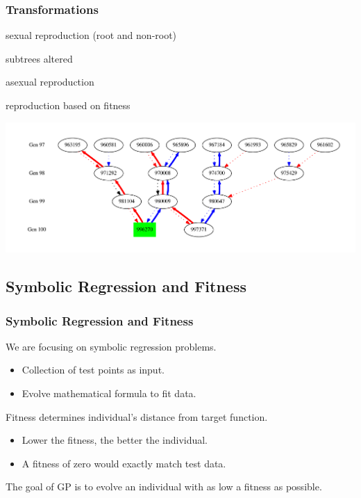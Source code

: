 \documentclass{beamer}
\newcommand{\linespace}{\vskip 0.25cm}
\begin{document}
\begin{frame}
  \frametitle{Transformations}

		\begin{description}[align=left, leftmargin=*]
		\item[Crossover (XO)] sexual reproduction (root and non-root)
		\item[Mutation] subtrees altered
		\item[Reproduction] asexual reproduction
		\item[Elitism] reproduction based on fitness
		\end{description}
\includegraphics[width=.95\textwidth]{XO_path_example.pdf}
\end{frame}

\subsection{Symbolic Regression and Fitness}

\begin{frame}
	\frametitle{Symbolic Regression and Fitness}
	
	We are focusing on symbolic regression problems.
	\begin{itemize}
		\item Collection of test points as input.
		\item Evolve mathematical formula to fit data.
	\end{itemize}
	
	\linespace
	
	Fitness determines individual's distance from target function.
	\begin{itemize}
		\item Lower the fitness, the better the individual.
		\item A fitness of zero would exactly match test data.
	\end{itemize}
	
	\linespace 
	
	The goal of GP is to evolve an individual with as low a fitness as possible.
	
\end{frame}
\end{document}
